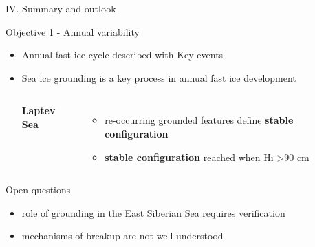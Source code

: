\documentclass[8pt]{beamer}
\begin{document}
\setwatermark{\fontsize{125pt}{125pt}\selectfont{}}
\begin{frame}{IV. Summary and outlook}
	\begin{block}{Objective 1 -  Annual variability}
		\begin{itemize}
			\item Annual fast ice cycle described with Key events
			\item Sea ice grounding is a key process in annual fast ice development
				\begin{columns}
					\begin{center}
						\textbf{Laptev Sea}
					\end{center}
					\begin{itemize}
						\item re-occurring grounded features define \textbf{stable configuration}
						\item \textbf{stable configuration} reached when Hi \textgreater 90 cm
					\end{itemize}			
						\end{columns}
			\end{itemize}
		\end{block}

		
	\begin{block}{Open questions}
		\begin{itemize}
			\item role of grounding in the East Siberian Sea requires verification
			\item mechanisms of breakup are not well-understood 
		\end{itemize}
	\end{block}
\end{frame}
\end{document}
